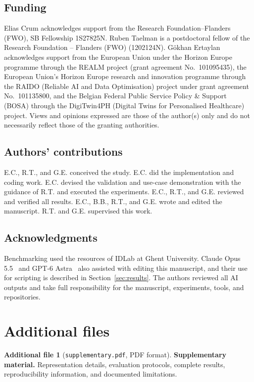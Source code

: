 \documentclass[pdflatex,sn-mathphys-num,referee]{sn-jnl}
\begin{document}
\subsection*{Funding}
Elias Crum acknowledges support from the Research Foundation--Flanders (FWO), SB Fellowship 1S27825N.
Ruben Taelman is a postdoctoral fellow of the Research Foundation -- Flanders (FWO) (1202124N).
Gökhan Ertaylan acknowledges support from the European Union under the Horizon Europe programme through the REALM project (grant agreement No.~101095435), the European Union's Horizon Europe research and innovation programme through the RAIDO (Reliable AI and Data Optimisation) project under grant agreement No.~101135800, and the Belgian Federal Public Service Policy \& Support (BOSA) through the DigiTwin4PH (Digital Twins for Personalised Healthcare) project.
Views and opinions expressed are those of the author(s) only and do not necessarily reflect those of the granting authorities.

\subsection*{Authors' contributions}
E.C., R.T., and G.E. conceived the study.
E.C. did the implementation and coding work.
E.C. devised the validation and use-case demonstration with the guidance of R.T. and executed the experiments.
E.C., R.T., and G.E. reviewed and verified all results.
E.C., B.B., R.T., and G.E. wrote and edited the manuscript.
R.T. and G.E. supervised this work.

\subsection*{Acknowledgments}
Benchmarking used the resources of IDLab at Ghent University.
Claude Opus 5.5~\cite{anthropic2026claudeopus55} and GPT-6 Astra~\cite{openai2026gpt6astra} also assisted with editing this manuscript, and their use for scripting is described in Section~\ref{sec:results}.
The authors reviewed all AI outputs and take full responsibility for the manuscript, experiments, tools, and repositories.




\section*{Additional files}
\textbf{Additional file 1} (\texttt{supplementary.pdf}, PDF format).
\textbf{Supplementary material.}
Representation details, evaluation protocols, complete results, reproducibility information, and documented limitations.
\end{document}
